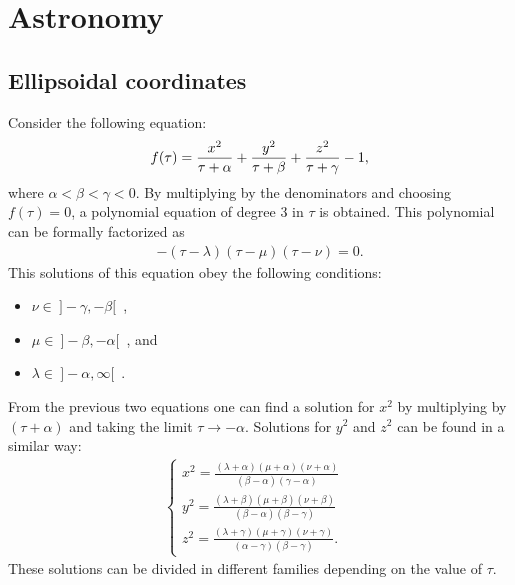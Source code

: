 \chapter{Astronomy}

\section{Ellipsoidal coordinates}

    Consider the following equation:
    \begin{gather}\index{coordinate!ellipsoidal}
        \label{astronomy:ellipsoidal_defining_function}
        f(\tau) = \frac{x^2}{\tau + \alpha} + \frac{y^2}{\tau + \beta} + \frac{z^2}{\tau + \gamma} - 1,
    \end{gather}
    where $\alpha<\beta<\gamma<0$. By multiplying by the denominators and choosing $f(\tau) = 0$, a polynomial equation of degree 3 in $\tau$ is obtained. This polynomial can be formally factorized as
    \begin{gather}
        -(\tau-\lambda)(\tau-\mu)(\tau-\nu) = 0.
    \end{gather}
    This solutions of this equation obey the following conditions:
    \begin{itemize}
        \item $\nu\in\ ]-\gamma,-\beta[$\ ,
        \item $\mu\in\ ]-\beta,-\alpha[$\ , and
        \item $\lambda\in\ ]-\alpha,\infty[$\ .
    \end{itemize}
    From the previous two equations one can find a solution for $x^2$ by multiplying by $(\tau+\alpha)$ and taking the limit $\tau\rightarrow-\alpha$. Solutions for $y^2$ and $z^2$ can be found in a similar way:
    \begin{gather}
        \label{astronomy:ellipsoidal_coordinates}
        \begin{cases}
            x^2 = \frac{(\lambda + \alpha)(\mu + \alpha)(\nu + \alpha)}{(\beta - \alpha)(\gamma - \alpha)}&\\
            y^2 = \frac{(\lambda + \beta)(\mu + \beta)(\nu + \beta)}{(\beta - \alpha)(\beta - \gamma)}&\\
            z^2 = \frac{(\lambda + \gamma)(\mu + \gamma)(\nu + \gamma)}{(\alpha - \gamma)(\beta - \gamma)}.&
        \end{cases}
    \end{gather}
    These solutions can be divided in different families depending on the value of $\tau$.

